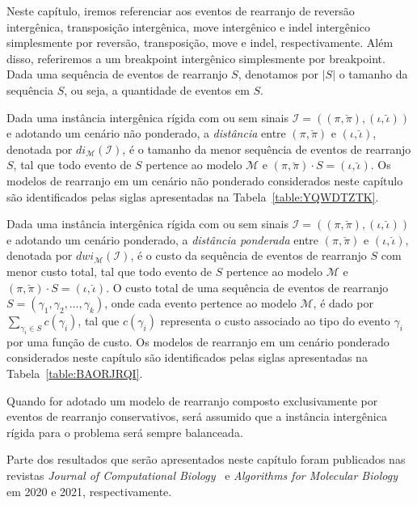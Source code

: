 Neste capítulo, iremos referenciar aos eventos de rearranjo de reversão intergênica, transposição intergênica, move intergênico e indel intergênico simplesmente por reversão, transposição, move e indel, respectivamente. Além disso, referiremos a um breakpoint intergênico simplesmente por breakpoint. Dada uma sequência de eventos de rearranjo $S$, denotamos por $|S|$ o tamanho da sequência $S$, ou seja, a quantidade de eventos em $S$.

Dada uma instância intergênica rígida com ou sem sinais $\mathcal{I}=((\pi,\breve\pi),(\iota,\breve\iota))$ e adotando um cenário não ponderado, a \emph{distância} entre $(\pi,\breve\pi)$ e $(\iota,\breve\iota)$, denotada por $di_{\mathcal{M}}(\mathcal{I})$, é o tamanho da menor sequência de eventos de rearranjo $S$, tal que todo evento de $S$ pertence ao modelo $\mathcal{M}$ e $(\pi,\breve\pi) \cdot S = (\iota,\breve\iota)$. Os modelos de rearranjo em um cenário não ponderado considerados neste capítulo são identificados pelas siglas apresentadas na Tabela~\ref{table:YQWDTZTK}.



Dada uma instância intergênica rígida com ou sem sinais $\mathcal{I}=((\pi,\breve\pi),(\iota,\breve\iota))$ e adotando um cenário ponderado, a \emph{distância ponderada} entre $(\pi,\breve\pi)$ e $(\iota,\breve\iota)$, denotada por $dwi_{\mathcal{M}}(\mathcal{I})$, é o custo da sequência de eventos de rearranjo $S$ com menor custo total, tal que todo evento de $S$ pertence ao modelo $\mathcal{M}$ e $(\pi,\breve\pi) \cdot S = (\iota,\breve\iota)$. O custo total de uma sequência de eventos de rearranjo $S=(\gamma_1, \gamma_2, \dots, \gamma_k)$, onde cada evento pertence ao modelo $\mathcal{M}$, é dado por $\sum_{\gamma_i \in S} c(\gamma_i)$, tal que $c(\gamma_i)$ representa o custo associado ao tipo do evento $\gamma_i$ por uma função de custo. Os modelos de rearranjo em um cenário ponderado considerados neste capítulo são identificados pelas siglas apresentadas na Tabela~\ref{table:BAORJRQI}.



Quando for adotado um modelo de rearranjo composto exclusivamente por eventos de rearranjo conservativos, será assumido que a instância intergênica rígida para o problema será sempre balanceada.

Parte dos resultados que serão apresentados neste capítulo foram publicados nas revistas \emph{Journal of Computational Biology}~\cite{2020a-brito-etal} e \emph{Algorithms for Molecular Biology}~\cite{2021b-brito-etal} em 2020 e 2021, respectivamente.


